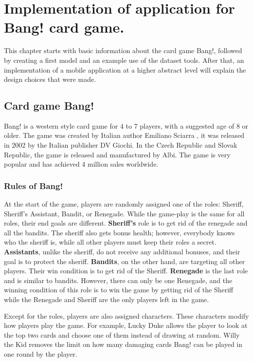 
\chapter{Implementation of application for Bang! card game.}
This chapter starts with basic information about the card game Bang!, followed by creating a first model and an example use of the dataset tools. After that, an implementation of a mobile application at a higher abstract level will explain the design choices that were made.

\section{Card game Bang!}
Bang! is a western style card game for 4 to 7 players, with a suggested age of 8 or older. The game was created by Italian author Emiliano Sciarra \cite{bangWiki}, it was released in 2002 by the Italian publisher DV Giochi. In the Czech Republic and Slovak Republic, the game is released and manufactured by Albi. The game is very popular and has achieved 4 million sales worldwide.

\subsection{Rules of Bang!}
At the start of the game, players are randomly assigned one of the roles: Sheriff, Sheriff's Assistant, Bandit, or Renegade. While the game-play is the same for all roles, their end goals are different. \textbf{Sheriff's} role is to get rid of the renegade and all the bandits. The sheriff also gets bonus health; however, everybody knows who the sheriff is, while all other players must keep their roles a secret. \textbf{Assistants}, unlike the sheriff, do not receive any additional bonuses, and their goal is to protect the sheriff. \textbf{Bandits}, on the other hand, are targeting all other players. Their win condition is to get rid of the Sheriff. \textbf{Renegade} is the last role and is similar to bandits. However, there can only be one Renegade, and the winning condition of this role is to win the game by getting rid of the Sheriff while the Renegade and Sheriff are the only players left in the game.

Except for the roles, players are also assigned characters. These characters modify how players play the game. For example, Lucky Duke allows the player to look at the top two cards and choose one of them instead of drawing at random. Willy the Kid removes the limit on how many damaging cards Bang! can be played in one round by the player.

